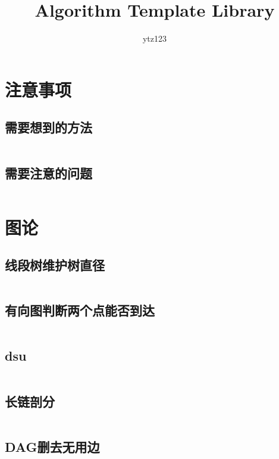 \documentclass{article}
\author{ytz123}
\title{Algorithm Template Library}
\begin{document}
 
\maketitle %
\newpage %
\tableofcontents %

\newpage
\section{注意事项} %
\subsection{需要想到的方法} %
\inputminted[breaklines]{text}{../注意事项/需要想到的方法.txt}

\subsection{需要注意的问题} %
\inputminted[breaklines]{text}{../注意事项/需要注意的问题.txt}

\newpage
\section{图论} %

\subsection{线段树维护树直径} %
\inputminted[breaklines]{c++}{../图论/线段树维护树直径.cpp} %

\subsection{有向图判断两个点能否到达} %
\inputminted[breaklines]{c++}{../图论/有向图判断两个点能否到达.cpp} %

\subsection{dsu} %
\inputminted[breaklines]{c++}{../图论/dsu.cpp} %

\subsection{长链剖分} %
\inputminted[breaklines]{c++}{../图论/长链剖分.cpp} %


\subsection{DAG删去无用边} %
\inputminted[breaklines]{c++}{../图论/DAG删去无用边.cpp} %
\end{document}

